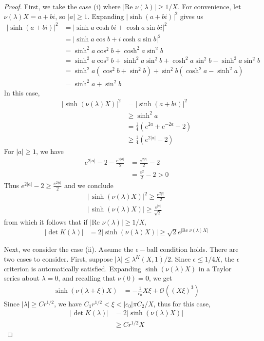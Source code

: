 \documentclass[thesis.tex]{subfiles}
\begin{document}
\begin{lemma}
\begin{proof}
First, we take the case (i) where $|\text{Re }\nu(\lambda)| \geq 1/X$. For convenience, let $\nu(\lambda)X = a + bi$, so $|a| \geq 1$. Expanding $|\sinh(a + b i)|^2$ gives us
\begin{align*}
|\sinh(a + b i)|^2 
&= |\sinh a \cosh b i + \cosh a \sin b i|^2 \\
&= |\sinh a \cos b + i \cosh a \sin b |^2 \\
&= \sinh^2 a \cos^2 b + \cosh^2 a \sin^2 b \\
&= \sinh^2 a \cos^2 b + \sinh^2 a \sin^2 b 
+ \cosh^2 a \sin^2 b - \sinh^2 a \sin^2 b \\
&= \sinh^2 a (\cos^2 b + \sin^2 b) 
+ \sin^2 b( \cosh^2 a - \sinh^2 a) \\
&= \sinh^2 a + \sin^2 b
\end{align*}
In this case,
\begin{align*}
|\sinh(\nu(\lambda) X)|^2 &= |\sinh(a + b i)|^2 \\
&\geq \sinh^2 a \\
&= \frac{1}{4}\left( e^{2a} + e^{-2a} - 2 \right) \\
&\geq \frac{1}{4}\left( e^{2|a|} - 2 \right)
\end{align*}
For $|a| \geq 1$, we have
\begin{align*}
e^{2|a|} - 2 - \frac{e^{2|a|}}{2} 
&= \frac{e^{2|a|}}{2} - 2 \\
&= \frac{e^2}{2} - 2 > 0
\end{align*}
Thus $e^{2|a|} - 2 \geq \frac{e^{2|a|}}{2}$ and we conclude
\begin{align*}
|\sinh(\nu(\lambda) X)|^2 \geq \frac{e^{2|a|}}{2} \\
|\sinh(\nu(\lambda) X)| \geq \frac{e^{|a|}}{\sqrt{2}}
\end{align*}
from which it follows that if $|\text{Re } \nu(\lambda)| \geq 1/X$,
\begin{align*}
|\det K(\lambda)| &= 2 |\sinh(\nu(\lambda) X)|
\geq \sqrt{2} e^{|\text{Re }\nu(\lambda)X|}
\end{align*}

Next, we consider the case (ii). Assume the $\epsilon-$ball condition holds. There are two cases to consider. First, suppose $|\lambda| \leq \lambda^K(X,1)/2$. Since $\epsilon \leq 1/4X$, the $\epsilon$ criterion is automatically satisfied. Expanding $\sinh( \nu(\lambda) X)$ in a Taylor series about $\lambda = 0$, and recalling that $\nu(0) = 0$, we get
\begin{align*}
\sinh(\nu(\lambda + \xi) X) &= -\frac{1}{c_0}X\xi + \mathcal{O}((X \xi)^3)
\end{align*}
Since $|\lambda| \geq C r^{1/2}$, we have $C_1 r^{1/2} < \xi < |c_0| \pi C_2/X$, thus for this case,
\begin{align*}
|\det K(\lambda)| &= 2 |\sinh(\nu(\lambda) X)| \\
& \geq C r^{1/2}X
\end{align*}


\end{proof}
\end{lemma}
\end{document}
